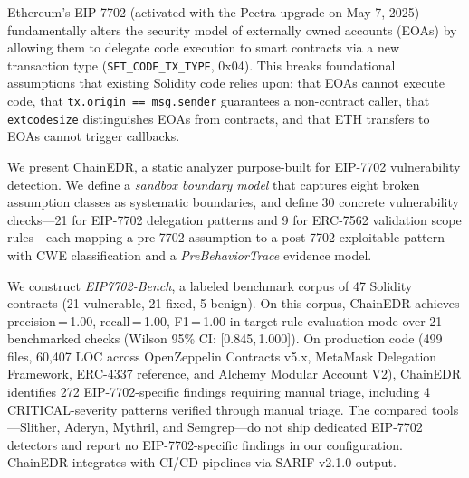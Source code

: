 Ethereum's EIP-7702 (activated with the Pectra upgrade on May 7, 2025) fundamentally alters the security model of externally owned accounts (EOAs) by allowing them to delegate code execution to smart contracts via a new transaction type (\texttt{SET\_CODE\_TX\_TYPE}, 0x04). This breaks foundational assumptions that existing Solidity code relies upon: that EOAs cannot execute code, that \texttt{tx.origin == msg.sender} guarantees a non-contract caller, that \texttt{extcodesize} distinguishes EOAs from contracts, and that ETH transfers to EOAs cannot trigger callbacks.

We present ChainEDR, a static analyzer purpose-built for EIP-7702 vulnerability detection. We define a \textit{sandbox boundary model} that captures eight broken assumption classes as systematic boundaries, and define 30 concrete vulnerability checks---21 for EIP-7702 delegation patterns and 9 for ERC-7562 validation scope rules---each mapping a pre-7702 assumption to a post-7702 exploitable pattern with CWE classification and a \textit{PreBehaviorTrace} evidence model.

We construct \textit{EIP7702-Bench}, a labeled benchmark corpus of 47 Solidity contracts (21 vulnerable, 21 fixed, 5 benign). On this corpus, ChainEDR achieves precision\,=\,1.00, recall\,=\,1.00, F1\,=\,1.00 in target-rule evaluation mode over 21 benchmarked checks (Wilson 95\% CI: [0.845,\,1.000]). On production code (499 files, 60,407 LOC across OpenZeppelin Contracts v5.x, MetaMask Delegation Framework, ERC-4337 reference, and Alchemy Modular Account V2), ChainEDR identifies 272 EIP-7702-specific findings requiring manual triage, including 4 CRITICAL-severity patterns verified through manual triage. The compared tools---Slither, Aderyn, Mythril, and Semgrep---do not ship dedicated EIP-7702 detectors and report no EIP-7702-specific findings in our configuration. ChainEDR integrates with CI/CD pipelines via SARIF v2.1.0 output.
